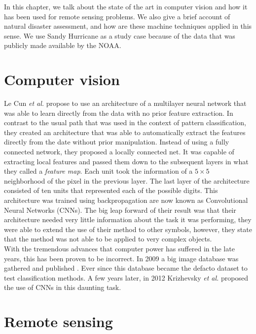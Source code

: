 In this chapter, we talk about the state of the art in computer vision and how it has been used for remote sensing problems. We also give a brief account of natural disaster assessment, and how are these machine techniques applied in this sense. We use Sandy Hurricane as a study case because of the data that was publicly made available by the NOAA.\\

\section{Computer vision}

Le Cun \textit{et al.} \cite{119325} propose to use an architecture of a multilayer neural network that was able to learn directly from the data with no prior feature extraction. In contrast to the usual path that was used in the context of pattern classification, they created an architecture that was able to automatically extract the features directly from the date without prior manipulation. Instead of using a fully connected network, they proposed a locally connected net. It was capable of extracting local features and passed them down to the subsequent layers in what they called a \textit{feature map}. Each unit took the information of a $5\times 5$ neighborhood of the pixel in the previous layer. The last layer of the architecture consisted of ten units that represented each of the possible digits. This architecture was trained using backpropagation are now known as Convolutional Neural Networks (CNNs). The big leap forward of their result was that their architecture needed very little information about the task it was performing, they were able to extend the use of their method to other symbols, however, they state that the method was not able to be applied to very complex objects.\\


With the tremendous advances that computer power has suffered in the late years, this has been proven to be incorrect. In 2009 a big image database was gathered and published \cite{Deng09imagenet:a}. Ever since this database became the defacto dataset to test classification methods. A few years later, in 2012 Krizhevsky \textit{et al.} \cite{krizhevsky} proposed the use of CNNs in this daunting task.\\

\section{Remote sensing}

